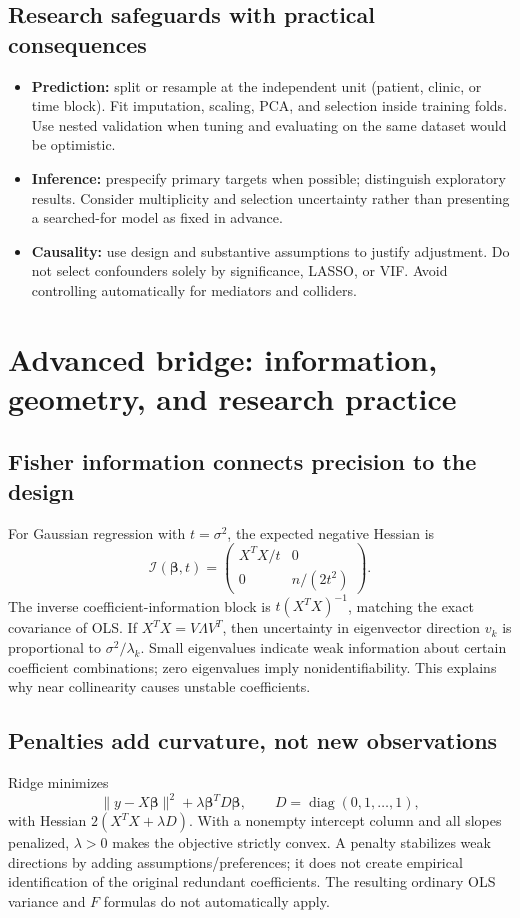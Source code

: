 \documentclass[11pt]{article}
\newcommand{\be}{\boldsymbol\beta}\newcommand{\eps}{\boldsymbol\varepsilon}\newcommand{\one}{\mathbf1}\newcommand{\R}{\mathbb R}
\begin{document}
\subsection{Research safeguards with practical consequences}
\begin{itemize}
\item \textbf{Prediction:} split or resample at the independent unit (patient, clinic, or time block). Fit imputation, scaling, PCA, and selection inside training folds. Use nested validation when tuning and evaluating on the same dataset would be optimistic.
\item \textbf{Inference:} prespecify primary targets when possible; distinguish exploratory results. Consider multiplicity and selection uncertainty rather than presenting a searched-for model as fixed in advance.
\item \textbf{Causality:} use design and substantive assumptions to justify adjustment. Do not select confounders solely by significance, LASSO, or VIF. Avoid controlling automatically for mediators and colliders.
\end{itemize}

\section{Advanced bridge: information, geometry, and research practice}
\subsection{Fisher information connects precision to the design}
For Gaussian regression with $t=\sigma^2$, the expected negative Hessian is
\[
\mathcal I(\be,t)=
\begin{pmatrix}X^TX/t&0\\0&n/(2t^2)\end{pmatrix}.
\]
The inverse coefficient-information block is $t(X^TX)^{-1}$, matching the exact covariance of OLS. If $X^TX=V\Lambda V^T$, then uncertainty in eigenvector direction $v_k$ is proportional to $\sigma^2/\lambda_k$. Small eigenvalues indicate weak information about certain coefficient combinations; zero eigenvalues imply nonidentifiability. This explains why near collinearity causes unstable coefficients.

\subsection{Penalties add curvature, not new observations}
Ridge minimizes
\[
\|y-X\be\|^2+\lambda\be^TD\be,
\qquad D=\operatorname{diag}(0,1,\ldots,1),
\]
with Hessian $2(X^TX+\lambda D)$. With a nonempty intercept column and all slopes penalized, $\lambda>0$ makes the objective strictly convex. A penalty stabilizes weak directions by adding assumptions/preferences; it does not create empirical identification of the original redundant coefficients. The resulting ordinary OLS variance and $F$ formulas do not automatically apply.
\end{document}
